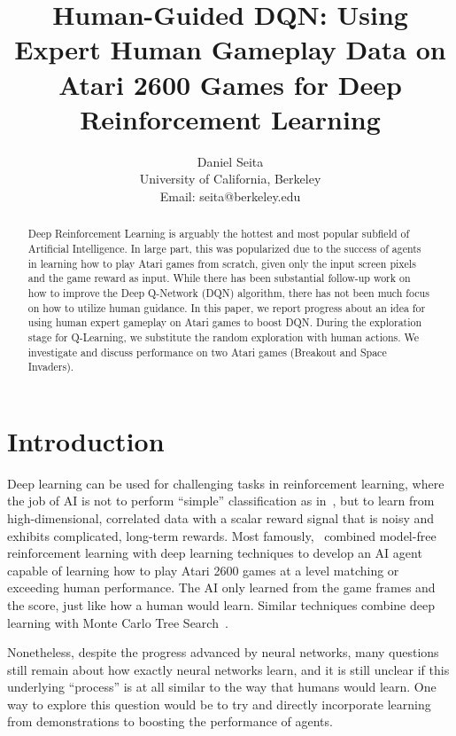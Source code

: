\documentclass[letterpaper, 10pt, conference]{ieeeconf}
\title{\LARGE \bf Human-Guided DQN: Using Expert Human Gameplay Data on Atari
2600 Games for Deep Reinforcement Learning}
\author{Daniel Seita \\
University of California, Berkeley\\
Email: seita@berkeley.edu
}
\begin{document}
\maketitle

\begin{abstract}
Deep Reinforcement Learning is arguably the hottest and most popular subfield of
Artificial Intelligence. In large part, this was popularized due to the success
of agents in learning how to play Atari games from scratch, given only the input
screen pixels and the game reward as input.  While there has been substantial
follow-up work on how to improve the Deep Q-Network (DQN) algorithm, there has
not been much focus on how to utilize human guidance. In this paper, we report
progress about an idea for using human expert gameplay on Atari games to boost
DQN. During the exploration stage for Q-Learning, we substitute the random
exploration with human actions. We investigate and discuss performance on two
Atari games (Breakout and Space Invaders).
\end{abstract}

\section{Introduction}\label{sec:introduction}

Deep learning can be used for challenging tasks in reinforcement learning, where
the job of AI is not to perform ``simple'' classification as
in~\cite{AlexNet2012}, but to learn from high-dimensional, correlated data with
a scalar reward signal that is noisy and exhibits complicated, long-term
rewards. Most famously,~\cite{mnih-dqn-2015} combined model-free reinforcement
learning with deep learning techniques to develop an AI agent capable of
learning how to play Atari 2600 games at a level matching or exceeding human
performance. The AI only learned from the game frames and the score, just like
how a human would learn. Similar techniques combine deep learning with Monte
Carlo Tree Search~\cite{nips-atari-2014,silver-alphago-2016}.

Nonetheless, despite the progress advanced by neural networks, many questions
still remain about how exactly neural networks learn, and it is still unclear if
this underlying ``process'' is at all similar to the way that humans would
learn. One way to explore this question would be to try and directly incorporate
learning from demonstrations to boosting the performance of agents.
\end{document}

